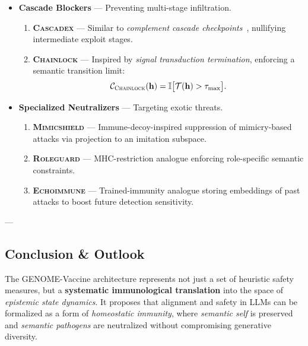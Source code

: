 \begin{itemize}
\begin{enumerate}
        \item \textbf{\textsc{Slumberseal}} — Parallels \emph{chromatin remodeling locks}, implementing temporal unlocking for high-risk trajectories.
    \end{enumerate}

    \item \textbf{Cascade Blockers} — Preventing multi-stage infiltration.
    \begin{enumerate}
        \item \textbf{\textsc{Cascadex}} — Similar to \emph{complement cascade checkpoints}~\cite{walport2001complement}, nullifying intermediate exploit stages.

        \item \textbf{\textsc{Chainlock}} — Inspired by \emph{signal transduction termination}, enforcing a semantic transition limit:
        \[
        \mathcal{C}_{\textsc{Chainlock}}(\mathbf{h}) = \mathbb{I}\big[\mathcal{T}(\mathbf{h}) > \tau_{\max}\big].
        \]
    \end{enumerate}

    \item \textbf{Specialized Neutralizers} — Targeting exotic threats.
    \begin{enumerate}
        \item \textbf{\textsc{Mimicshield}} — Immune-decoy-inspired suppression of mimicry-based attacks via projection to an imitation subspace.
        
        \item \textbf{\textsc{Roleguard}} — MHC-restriction analogue enforcing role-specific semantic constraints.
        
        \item \textbf{\textsc{Echoimmune}} — Trained-immunity analogue storing embeddings of past attacks to boost future detection sensitivity.
    \end{enumerate}
\end{itemize}

---

\subsection*{Conclusion \& Outlook}

The GENOME-Vaccine architecture represents not just a set of heuristic safety measures, but a \textbf{systematic immunological translation} into the space of \emph{epistemic state dynamics}. It proposes that alignment and safety in LLMs can be formalized as a form of \emph{homeostatic immunity}, where \emph{semantic self} is preserved and \emph{semantic pathogens} are neutralized without compromising generative diversity.

